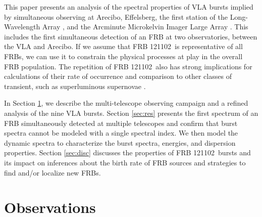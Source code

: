 \documentclass[twocolumn]{aastex61}
\newcommand{\frb}{FRB 121102}
\begin{document}
This paper presents an analysis of the spectral properties of VLA bursts implied by simultaneous observing at Arecibo, Effelsberg, the first station of the Long-Wavelength Array \citep[LWA1; ][]{2013ITAP...61.2540E}, and the Arcminute Microkelvin Imager Large Array \citep[AMI-LA; ][]{2008MNRAS.391.1545Z}. This includes the first simultaneous detection of an FRB at two observatories, between the VLA and Arecibo. If we assume that \frb\ is representative of all FRBs, we can use it to constrain the physical processes at play in the overall FRB population. The repetition of \frb\ also has strong implications for calculations of their rate of occurrence \citep{2016MNRAS.458L..89C} and comparison to other classes of transient, such as superluminous supernovae \citep{OPT}.

In Section \ref{sec:obs}, we describe the multi-telescope observing campaign and a refined analysis of the nine VLA bursts. Section \ref{sec:res} presents the first spectrum of an FRB simultaneously detected at multiple telescopes and confirm that burst spectra cannot be modeled with a single spectral index. We then model the dynamic spectra to characterize the burst spectra, energies, and dispersion properties. Section \ref{sec:disc} discusses the properties of \frb\ bursts and its impact on inferences about the birth rate of FRB sources and strategies to find and/or localize new FRBs.

\section{Observations}
\label{sec:obs}
\end{document}
